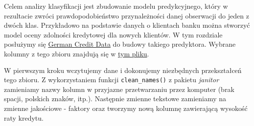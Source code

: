 \documentclass[
]{book}
\newenvironment{Shaded}{\begin{snugshade}}{\end{snugshade}}
\newcommand{\DataTypeTok}[1]{\textcolor[rgb]{0.13,0.29,0.53}{#1}}
\newcommand{\KeywordTok}[1]{\textcolor[rgb]{0.13,0.29,0.53}{\textbf{#1}}}
\newcommand{\NormalTok}[1]{#1}
\newcommand{\OperatorTok}[1]{\textcolor[rgb]{0.81,0.36,0.00}{\textbf{#1}}}
\newcommand{\StringTok}[1]{\textcolor[rgb]{0.31,0.60,0.02}{#1}}
\begin{document}
Celem analizy klasyfikacji jest zbudowanie modelu predykcyjnego, który w rezultacie zwróci prawdopodobieństwo przynależności danej obserwacji do jeden z dwóch klas. Przykładowo na podstawie danych o klientach banku można stworzyć model oceny zdolności kredytowej dla nowych klientów. W tym rozdziale posłużymy się \href{https://archive.ics.uci.edu/ml/datasets/statlog+(german+credit+data)}{German Credit Data} do budowy takiego predyktora. Wybrane kolumny z tego zbioru znajdują się w \href{data/german_credit_data.xlsx}{tym pliku}.

W pierwszym kroku wczytujemy dane i dokonujemy niezbędnych przekształceń tego zbioru. Z wykorzystaniem funkcji \texttt{clean\_names()} z pakietu \emph{janitor} zamieniamy nazwy kolumn w przyjazne przetwarzaniu przez komputer (brak spacji, polskich znaków, itp.). Następnie zmienne tekstowe zamieniamy na zmienne jakościowe - faktory oraz tworzymy nową kolumnę zawierającą wysokość raty kredytu.

\begin{Shaded}
\end{Shaded}
\end{document}
